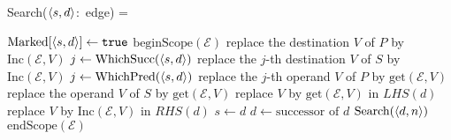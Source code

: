 Search($\left\langle s,d \right\rangle$:~edge) =
\begin{myalgorithmic}
\STATE $\text{Marked}[\left\langle s,d \right\rangle] \gets \texttt{true}$
\STATE $\text{beginScope}(\mathcal{E})$
  \STATE replace the destination $V$ of $P$ by $\text{Inc}(\mathcal{E}, V)$
 \ENDFOR
{}
  \STATE $j \gets \text{WhichSucc}(\left\langle s,d \right\rangle)$
  \STATE replace the $j$-th destination $V$ of $S$ by $\text{Inc}(\mathcal{E}, V)$
 \ENDFOR
\ENDIF
{}
   \STATE $j\gets \text{WhichPred}(\left\langle s,d \right\rangle)$
   \STATE replace the $j$-th operand $V$ of $P$ by $\text{get}(\mathcal{E}, V)$
  \ENDFOR
  \BREAK {}
   \STATE replace the operand $V$ of $S$ by $\text{get}(\mathcal{E}, V)$
  \ENDFOR
  \BREAK {}
 \ENDIF
 \STATE{}
  \STATE replace $V$ by $\text{get}(\mathcal{E}, V)$ in $LHS(d)$
 \ENDFOR
  \STATE replace $V$ by $\text{Inc}(\mathcal{E}, V)$ in $RHS(d)$
 \ENDFOR
  \BREAK {}
 \ENDIF
 \STATE $s \gets d$
 \STATE $d \gets \text{successor of }d$
\ENDLOOP*
{}
  \STATE $\text{Search}(\left\langle d, n \right\rangle)$ 
 \ENDIF
\ENDFOR
\STATE $\text{endScope}(\mathcal{E})$
\RETURN
\end{myalgorithmic}
